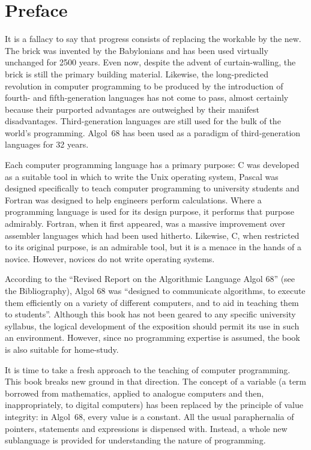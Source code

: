 %
%
\parindent=5mm
\chapter{Preface}
It is a fallacy to say that progress consists of replacing the workable
by the new.  The brick was invented by the Babylonians and has been
used virtually unchanged for 2500 years.  Even now, despite the advent
of curtain-walling, the brick is still the primary building material.
Likewise, the long-predicted revolution in computer programming to be
produced by the introduction of fourth- and fifth-generation languages
has not come to pass, almost certainly because their purported
advantages are outweighed by their manifest disadvantages. 
Third-generation languages are still used for the bulk of the world's
programming.  Algol~68 has been used as a paradigm of third-generation
languages for 32 years.

Each computer programming language has a primary purpose: C was
developed as a suitable tool in which to write the Unix operating
system, Pascal was designed specifically to teach computer programming
to university students and Fortran was designed to help engineers
perform calculations. Where a programming language is used for its
design purpose, it performs that purpose admirably. Fortran, when it
first appeared, was a massive improvement over assembler languages
which had been used hitherto.  Likewise, C, when restricted to its
original purpose, is an admirable tool, but it is a menace in the hands
of a novice.  However, novices do not write operating systems.

According to the ``Revised Report on the Algorithmic Language Algol
68'' (see the Bibliography), Algol 68 was ``designed to communicate
algorithms, to execute them efficiently on a variety of different
computers, and to aid in teaching them to students''.  Although this
book has not been geared to any specific university syllabus, the
logical development of the exposition should permit its use in such an
environment.  However, since no programming expertise is assumed, the
book is also suitable for home-study.

It is time to take a fresh approach to the teaching of computer
programming.  This book breaks new ground in that direction.  The
concept of a variable (a term borrowed from mathematics, applied to
analogue computers and then, inappropriately, to digital computers) has
been replaced by the principle of value integrity: in Algol~68, every
value is a constant.  All the usual paraphernalia of pointers,
statements and expressions is dispensed with. Instead, a whole new
sublanguage is provided for understanding the nature of programming.

